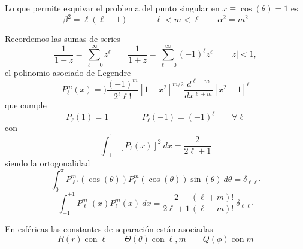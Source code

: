 \documentclass[10pt,oneside]{CBFT_book}
\begin{document}
Lo que permite esquivar el problema del punto singular en $x \equiv \cos(\theta)=1$ es
\[
	\beta^2 = \ell(\ell + 1) \qquad - \ell < m < \ell \qquad \alpha^2 = m^2
\]

Recordemos las sumas de series
\[
	\frac{1}{1-z} = \sum_{\ell=0}^{\infty} z^\ell \qquad \frac{1}{1+z} = \sum_{\ell=0}^{\infty} (-1)^\ell 
	z^\ell	\qquad |z|<1,
\]
el polinomio asociado de Legendre
\[
	P_\ell^m (x) =) \frac{(-1)^m}{2^\ell \ell!} [1-x^2]^{m/2} \frac{d^{\ell + m}}{dx^{\ell + m}} 
			[x^2 -1]^\ell
\]
que cumple
\[
	P_\ell (1) = 1 \qquad  \qquad P_\ell (-1) = (-1)^\ell \qquad  \forall \ell
\]
con 
\[
	\int_{-1}^1 [P_\ell (x)]^2 \: dx = \frac{2}{ 2\ell + 1 }
\]
siendo la ortogonalidad
\[
	\int_0^\pi P_{\ell'}^m (\cos(\theta)) P_\ell^m (\cos(\theta)) \sin(\theta) \: d\theta = 
	\delta_{\ell\ell'}
\]
\[
	\int_{-1}^{+1} P_{\ell'}^m (x) P_\ell^m (x) \: dx= \frac{2}{2\ell + 1}
	\frac{(\ell + m)!}{(\ell - m)!} \: \delta_{\ell\ell'}
\]

En esféricas las constantes de separación están asociadas
\[
	R(r) \; \mathrm{con} \; \ell \qquad \Theta(\theta) \; \mathrm{con} \; \ell,m \qquad
	Q(\phi) \; \mathrm{con} \; m
\]
\end{document}
